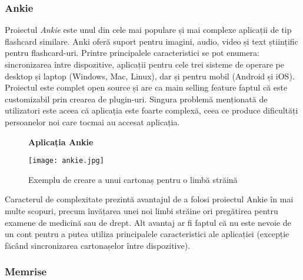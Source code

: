 \subsubsection{Ankie}

\noindent\begin{minipage}{0.6\textwidth}
    Proiectul \textit{Ankie} \cite{anki} este unul din cele mai populare și mai complexe aplicații de tip flashcard similare. Anki oferă suport pentru imagini, audio, video și text științific pentru flashcard-uri. Printre principalele caracteristici se pot enumera: sincronizarea între dispozitive, aplicații pentru cele trei sisteme de operare pe desktop și laptop (Windows, Mac, Linux), dar și pentru mobil (Android și iOS). Proiectul este complet open source și are ca main selling feature faptul că este customizabil prin crearea de plugin-uri. Singura problemă menționată de utilizatori este aceea că aplicația este foarte complexă, ceea ce produce dificultăți persoanelor noi care tocmai au accesat aplicația.
\end{minipage} 
\hfill
\begin{minipage}{0.35\textwidth}
    \begin{figure}[H]
    \centering
    \textbf{Aplicația Ankie}\par\medskip
    \texttt{[image: ankie.jpg]}
    \caption{Exemplu de creare a unui cartonaș pentru o limbă străină \cite{ankiImageExample}} 
    \label{fig:exemplu_ankie}
    \end{figure}
\end{minipage}

\bigbreak
Caracterul de complexitate prezintă avantajul de a folosi proiectul Ankie în mai multe scopuri, precum învățarea unei noi limbi străine ori pregătirea pentru examene de medicină sau de drept. Alt avantaj ar fi faptul că nu este nevoie de un cont pentru a putea utiliza principalele caracteristici ale aplicației (excepție făcând sincronizarea cartonașelor între dispozitive).

\subsubsection{Memrise}


